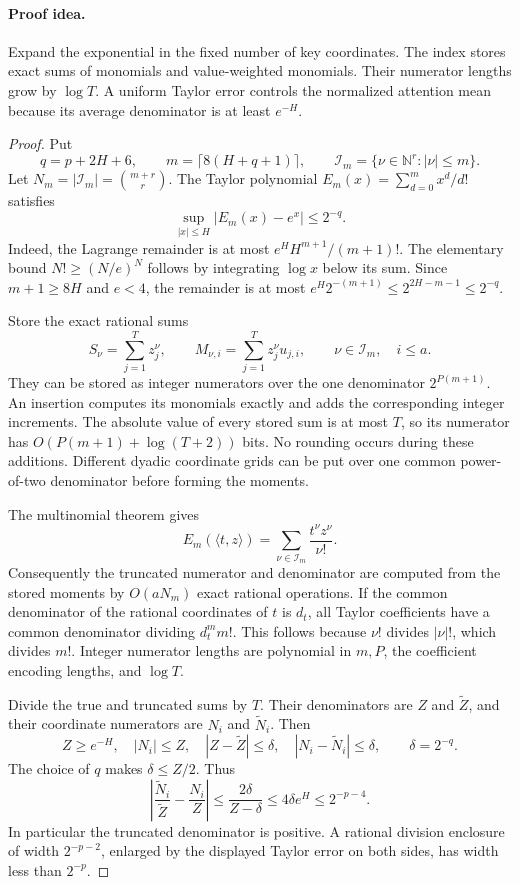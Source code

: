 \paragraph{Proof idea.}
Expand the exponential in the fixed number of key coordinates.
The index stores exact sums of monomials and value-weighted
monomials.  Their numerator lengths grow by $\log T$.  A uniform
Taylor error controls the normalized attention mean because its
average denominator is at least $e^{-H}$.

\begin{proof}
Put
\[
 q=p+2H+6,\qquad m=\lceil8(H+q+1)\rceil,\qquad
 \mathcal I_m=\{\nu\in\mathbb N^r:|\nu|\le m\}.
\]
Let $N_m=|\mathcal I_m|=\binom{m+r}{r}$.  The Taylor polynomial
$E_m(x)=\sum_{d=0}^m x^d/d!$ satisfies
\begin{equation}
 \sup_{|x|\le H}|E_m(x)-e^x|\le2^{-q}.
 \label{eq:momenttaylorerror}
\end{equation}
Indeed, the Lagrange remainder is at most
$e^H H^{m+1}/(m+1)!$.  The elementary bound
$N!\ge(N/e)^N$ follows by integrating $\log x$ below its sum.
Since $m+1\ge8H$ and $e<4$, the remainder is at most
$e^H2^{-(m+1)}\le2^{2H-m-1}\le2^{-q}$.

Store the exact rational sums
\[
 S_\nu=\sum_{j=1}^T z_j^\nu,\qquad
 M_{\nu,i}=\sum_{j=1}^T z_j^\nu u_{j,i},
 \qquad \nu\in\mathcal I_m,\quad i\le a.
\]
They can be stored as integer numerators over the one denominator
$2^{P(m+1)}$.  An insertion computes its monomials exactly and
adds the corresponding integer increments.  The absolute value
of every stored sum is at most $T$, so its numerator has
$O(P(m+1)+\log(T+2))$ bits.  No rounding occurs during these
additions.  Different dyadic coordinate grids can be put over one
common power-of-two denominator before forming the moments.

The multinomial theorem gives
\[
 E_m(\langle t,z\rangle)=
 \sum_{\nu\in\mathcal I_m}\frac{t^\nu z^\nu}{\nu!}.
\]
Consequently the truncated numerator and denominator are computed
from the stored moments by $O(aN_m)$ exact rational operations.
If the common denominator of the rational coordinates of $t$ is
$d_t$, all Taylor coefficients have a common denominator dividing
$d_t^m m!$.  This follows because $\nu!$ divides $|\nu|!$, which
divides $m!$.  Integer numerator lengths are polynomial in
$m,P$, the coefficient encoding lengths, and $\log T$.

Divide the true and truncated sums by $T$.  Their denominators
are $Z$ and $\widetilde Z$, and their coordinate numerators are
$N_i$ and $\widetilde N_i$.  Then
\[
 Z\ge e^{-H},\quad |N_i|\le Z,\quad
 |Z-\widetilde Z|\le\delta,\quad
 |N_i-\widetilde N_i|\le\delta,
 \qquad \delta=2^{-q}.
\]
The choice of $q$ makes $\delta\le Z/2$.  Thus
\[
 \left|\frac{\widetilde N_i}{\widetilde Z}
            -\frac{N_i}{Z}\right|
 \le\frac{2\delta}{Z-\delta}
 \le4\delta e^H
 \le2^{-p-4}.
\]
In particular the truncated denominator is positive.  A rational
division enclosure of width $2^{-p-2}$, enlarged by the displayed
Taylor error on both sides, has width less than $2^{-p}$.


\end{proof}
